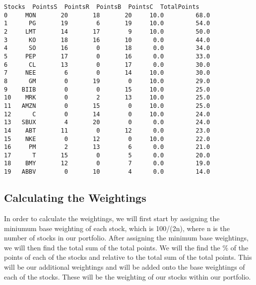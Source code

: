 \documentclass[11pt]{article}
\makeatletter
\newcommand{\boxspacing}{\kern\kvtcb@left@rule\kern\kvtcb@boxsep}
\newcommand{\prompt}[4]{
        {\ttfamily\llap{{\color{#2}[#3]:\hspace{3pt}#4}}\vspace{-\baselineskip}}
    }
\makeatother
\begin{document}
            \begin{tcolorbox}[breakable, size=fbox, boxrule=.5pt, pad at break*=1mm, opacityfill=0]
\prompt{Out}{outcolor}{34}{\boxspacing}
\begin{Verbatim}[commandchars=\\\{\}]
   Stocks  PointsS  PointsR  PointsB  PointsC  TotalPoints
0     MON       20       18       20     10.0         68.0
1      PG       19        6       19     10.0         54.0
2     LMT       14       17        9     10.0         50.0
3      KO       18       16       10      0.0         44.0
4      SO       16        0       18      0.0         34.0
5     PEP       17        0       16      0.0         33.0
6      CL       13        0       17      0.0         30.0
7     NEE        6        0       14     10.0         30.0
8      GM        0       19        0     10.0         29.0
9    BIIB        0        0       15     10.0         25.0
10    MRK        0        2       13     10.0         25.0
11   AMZN        0       15        0     10.0         25.0
12      C        0       14        0     10.0         24.0
13   SBUX        4       20        0      0.0         24.0
14    ABT       11        0       12      0.0         23.0
15    NKE        0       12        0     10.0         22.0
16     PM        2       13        6      0.0         21.0
17      T       15        0        5      0.0         20.0
18    BMY       12        0        7      0.0         19.0
19   ABBV        0       10        4      0.0         14.0
\end{Verbatim}
\end{tcolorbox}
        
    \hypertarget{calculating-the-weightings}{%
\subsection{Calculating the
Weightings}\label{calculating-the-weightings}}

In order to calculate the weightings, we will first start by assigning
the miniumum base weighting of each stock, which is 100/(2n), where n is
the number of stocks in our portfolio. After assigning the minimum base
weightings, we will then find the total sum of the total points. We will
the find the \% of the points of each of the stocks and relative to the
total sum of the total points. This will be our additional weightings
and will be added onto the base weightings of each of the stocks. These
will be the weighting of our stocks within our portfolio.
\end{document}

